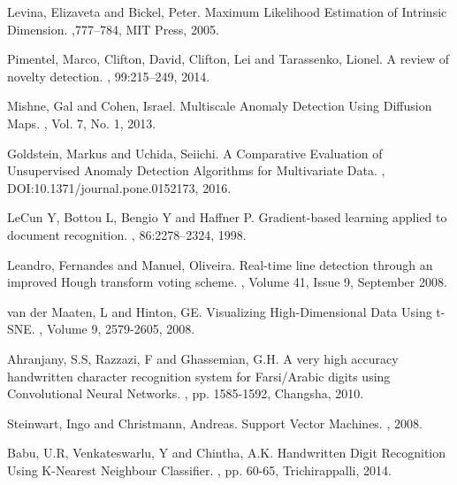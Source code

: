 \begin{thebibliography}{99}
 Levina, Elizaveta  and Bickel, Peter.
\newblock  Maximum Likelihood Estimation of Intrinsic Dimension.
,777--784, MIT Press, 2005.

 Pimentel, Marco, Clifton, David, Clifton,  Lei  and 
Tarassenko, Lionel.
\newblock   A review of novelty detection.
, 99:215–249, 2014.

 Mishne, Gal and Cohen, Israel.
\newblock Multiscale Anomaly Detection Using Diffusion Maps.
, Vol. 7, No. 1, 2013.

 Goldstein, Markus and Uchida, Seiichi.
\newblock A Comparative Evaluation of Unsupervised Anomaly Detection Algorithms for Multivariate Data.
, DOI:10.1371/journal.pone.0152173, 2016.

 LeCun Y, Bottou L, Bengio Y and Haffner P.
\newblock Gradient-based learning applied to document recognition.
, 86:2278–2324, 1998.


 Leandro, Fernandes and Manuel, Oliveira.
\newblock Real-time line detection through an improved Hough transform voting scheme.
, Volume 41, Issue 9, September 2008.


 van der Maaten, L and Hinton, GE.
\newblock Visualizing High-Dimensional Data Using t-SNE.
, Volume 9, 2579-2605, 2008.


Ahranjany, S.S, Razzazi, F and Ghassemian, G.H.
\newblock A very high accuracy handwritten character recognition system for Farsi/Arabic digits using Convolutional Neural Networks. 
, pp. 1585-1592, Changsha, 2010.

 Steinwart, Ingo  and Christmann, Andreas.	
\newblock Support Vector Machines.
, 2008.

 Babu, U.R, Venkateswarlu, Y and Chintha, A.K.	
\newblock Handwritten Digit Recognition Using K-Nearest Neighbour Classifier.
,  pp. 60-65, Trichirappalli, 2014.






\end{thebibliography}
